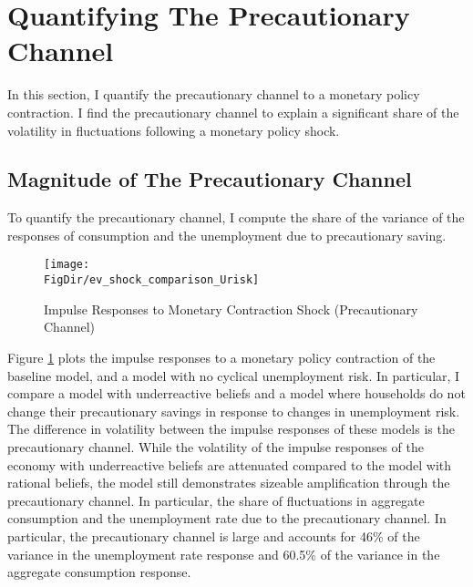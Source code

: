 \documentclass[titlepage]{\econtex}\providecommand{\texname}{Dissertation-Proposal}
\providecommand{\FigDir}{Figures}
\begin{document}
\hypertarget{ Quantifying The Precautionary Channel}{}
\section{Quantifying The Precautionary Channel}

In this section, I quantify the precautionary channel to a monetary policy contraction. I find the precautionary channel to explain a significant share of the volatility in fluctuations following a monetary policy shock.


\hypertarget{Magnitude of The Precautionary Channel}{}
\subsection{Magnitude of The Precautionary Channel}

To quantify the precautionary channel, I compute the share of the variance of the responses of consumption and the unemployment due to precautionary saving. \\ 

\begin{figure}
    \centering
    
        \caption{Impulse Responses to Monetary Contraction Shock (Precautionary Channel)}
    \texttt{[image: \\FigDir/ev\_shock\_comparison\_Urisk]}

     \label{fig:IPR_ev_Urisk}
\end{figure}




Figure \ref{fig:IPR_ev_Urisk} plots the impulse responses to a monetary policy contraction of the baseline model, and a model with no cyclical unemployment risk. In particular, I compare a model with underreactive beliefs and a model where households do not change their precautionary savings in response to changes in unemployment risk. The difference in volatility between the impulse responses of these models is the precautionary channel. While the volatility of the impulse responses of the economy with underreactive beliefs are attenuated compared to the model with rational beliefs, the model still demonstrates sizeable amplification through the precautionary channel. In particular, the share of fluctuations in aggregate consumption and the unemployment rate due to the precautionary channel. In particular, the precautionary channel is large and accounts for 46\% of the variance in the unemployment rate response and 60.5\% of the variance in the aggregate consumption response. \\
\end{document}
